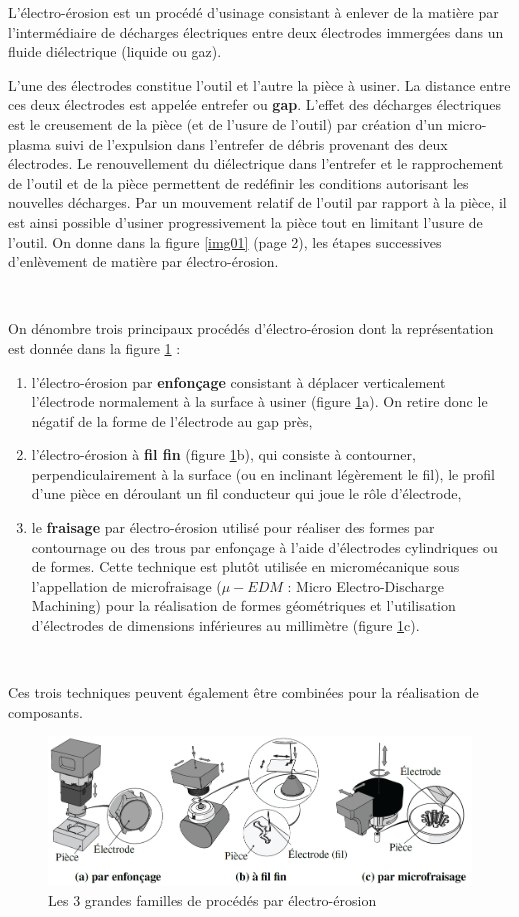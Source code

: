 L'électro-érosion est un procédé d'usinage consistant à enlever de la matière par l'intermédiaire de décharges électriques entre deux électrodes immergées dans un fluide diélectrique (liquide ou gaz).

L'une des électrodes constitue l'outil et l'autre la pièce à usiner. La distance entre ces deux électrodes est appelée entrefer ou \textbf{gap}. L'effet des décharges électriques est le creusement de la pièce (et de l'usure de l'outil) par création d'un micro-plasma suivi de l'expulsion dans l'entrefer de débris provenant des deux électrodes. Le renouvellement du diélectrique dans l'entrefer et le rapprochement de l'outil et de la pièce permettent de redéfinir les conditions autorisant les nouvelles décharges. Par un
mouvement relatif de l'outil par rapport à la pièce, il est ainsi possible d'usiner progressivement la pièce tout en limitant l'usure de l'outil. On donne dans la figure \ref{img01} (page 2), les étapes successives d'enlèvement de matière par électro-érosion.

~\

On dénombre trois principaux procédés d'électro-érosion dont la représentation est donnée dans la figure \ref{img02} :
\begin{enumerate}
 \item l'électro-érosion par \textbf{enfonçage} consistant à déplacer verticalement l'électrode normalement à la surface à usiner (figure \ref{img02}a). On retire donc le négatif de la forme de l'électrode au gap près,
 \item l'électro-érosion à \textbf{fil fin} (figure \ref{img02}b), qui consiste à contourner, perpendiculairement à la surface (ou en inclinant légèrement le fil), le profil d'une pièce en déroulant un fil conducteur qui joue le rôle d'électrode,
 \item le \textbf{fraisage} par électro-érosion utilisé pour réaliser des formes par contournage ou des trous par enfonçage à l'aide d'électrodes cylindriques ou de formes. Cette technique est plutôt utilisée en micromécanique sous l'appellation de microfraisage ($\mu-EDM$ : Micro Electro-Discharge Machining) pour la réalisation de formes géométriques et l'utilisation d'électrodes de dimensions inférieures au millimètre (figure \ref{img02}c).
\end{enumerate}

~\

Ces trois techniques peuvent également être combinées pour la réalisation de composants.

\begin{figure}[!h]
 \centering\includegraphics[width=0.9\linewidth]{img/img02}
 \caption{Les 3 grandes familles de procédés par électro-érosion}
 \label{img02}
\end{figure}

